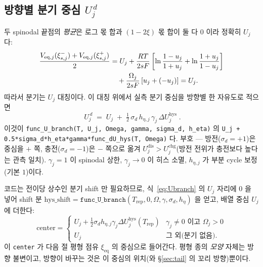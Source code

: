 \documentclass[11pt,a4paper]{article}
\newcommand{\eq}{\mathrm{eq}}
\newcommand{\dis}{\mathrm{dis}}
\newcommand{\chg}{\mathrm{chg}}
\newcommand{\hys}{\mathrm{hys}}
\newcommand{\rep}{\mathrm{rep}}
\newcommand{\code}[1]{\texttt{#1}}
\begin{document}
\subsection{방향별 분기 중심 $U_j^{\,d}$}
두 spinodal 끝점의 \emph{평균}은 로그 몫 합과 $(1-2\xi)$ 몫 합이 둘 다 $0$ 이라 정확히 $U_j$ 다:
\begin{align}
\frac{V_{\eq,j}(\xi_{s,j}^-)+V_{\eq,j}(\xi_{s,j}^+)}{2}
&=U_j+\frac{RT}{2sF}
\left[\ln\frac{1-u_j}{1+u_j}+\ln\frac{1+u_j}{1-u_j}\right]\notag\\
&\quad+\frac{\Omega_j}{2sF}\,[u_j+(-u_j)]
=U_j.
\label{eq:hyssym_v809}
\end{align}
따라서 분기는 $U_j$ 대칭이다. 이 대칭 위에서 실측 분기 중심을 방향별 한 자유도로 적으면
\begin{equation}
\boxed{\;U_j^{\,d}\;=\;U_j\;+\;\tfrac12\,\sigma_d\,h_{\eta,j}\,\gamma_j\,\Delta U_j^\hys\;.}
\label{eq:Ubranch}
\end{equation}
이것이 \code{func\_U\_branch(T, U\_j, Omega, gamma, sigma\_d, h\_eta)} 의
\code{U\_j + 0.5*sigma\_d*h\_eta*gamma*func\_dU\_hys(T, Omega)} 다. 부호 — 방전($\sigma_d=+1$)은 중심을 $+$ 쪽,
충전($\sigma_d=-1$)은 $-$ 쪽으로 옮겨 $U_j^{\dis}>U_j^{\chg}$(방전 전위가 충전보다 높다는 관측 일치). $\gamma_j=1$ 이
spinodal 상한, $\gamma_j\to0$ 이 히스 소멸, $h_{\eta,j}$ 가 부분 cycle 보정(기본 $1$)이다.

코드는 전이당 상수인 분기 shift 만 필요하므로, 식~\eqref{eq:Ubranch} 의 $U_j$ 자리에 $0$ 을 넣어 shift 분
$\mathrm{hys\_shift}=\code{func\_U\_branch}(T_\rep,0,\Omega,\gamma,\sigma_d,h_\eta)$ 을 얻고, 배열 중심 $U_j$ 에 더한다:
\begin{equation}
\mathrm{center}=
\begin{cases}
U_j+\tfrac12\sigma_d h_{\eta,j}\gamma_j\Delta U_j^\hys(T_\rep) & \gamma_j\ne0 \text{ 이고 } \Omega_j>0\\[2pt]
U_j & \text{그 외(분기 없음)}.
\end{cases}
\label{eq:center}
\end{equation}
이 \code{center} 가 다음 절 평형 점유 $\xi_\eq$ 의 중심으로 들어간다. 평형 종의 \emph{모양} 자체는 방향 불변이고,
방향이 바꾸는 것은 이 중심의 위치(와 \S\ref{sec:tail} 의 꼬리 방향)뿐이다.
\end{document}
